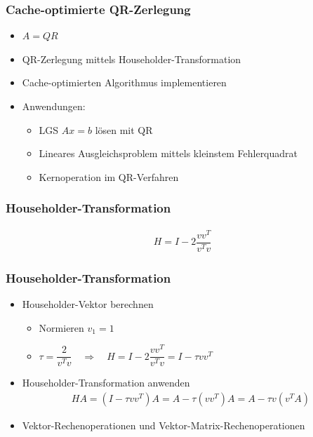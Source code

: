 \begin{frame}
\frametitle{Cache-optimierte QR-Zerlegung}
\vspace{-.6cm}
\begin{itemize}
	\item $ A = QR $
	
	\item QR-Zerlegung mittels Householder-Transformation
	\item Cache-optimierten Algorithmus implementieren
	\item Anwendungen:
	\begin{itemize}
		\item LGS $ Ax = b $ lösen mit QR
		\item Lineares Ausgleichsproblem mittels kleinstem Fehlerquadrat
		\item Kernoperation im QR-Verfahren
	\end{itemize}
\end{itemize}

\end{frame}

\begin{frame}
	\frametitle{Householder-Transformation}
	\vspace{-1cm}
	\begin{align*}
		H = I - 2 \dfrac{vv^T}{v^Tv}
	\end{align*}
	\centering
	\scalebox{.8}{}

\end{frame}

\begin{frame}
	\frametitle{Householder-Transformation}
	\vspace{-1cm}
	\begin{itemize}
	\item Householder-Vektor berechnen\\
		\begin{itemize}
			\item Normieren $ v_1 = 1 $
			\item $ \tau = \dfrac{2}{v^Tv} \quad \Longrightarrow \quad H = I - 2 \dfrac{vv^T}{v^Tv} = I - \tau vv^T$
		\end{itemize}
		

	\item  Householder-Transformation anwenden
		\begin{align*} 
		H A =(I - \tau vv^T) A= A - \tau (vv^T )A = A - \tau v(v^TA)
		\end{align*}
	\item  Vektor-Rechenoperationen und Vektor-Matrix-Rechenoperationen
	\end{itemize}
\end{frame}

